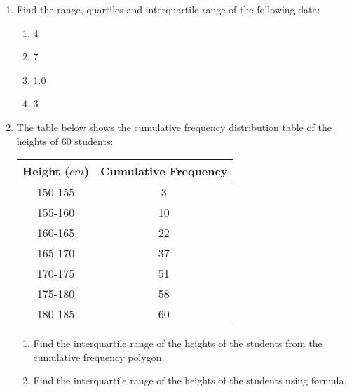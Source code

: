 \documentclass{report}
\begin{document}
\begin{multicols}{2}
  \begin{enumerate}
    \item Find the range, quartiles and interquartile range of the following data:
          \begin{enumerate}
            \item 4          
            \item 7        
            \item 1.0      \   
            \item 3       
          \end{enumerate}
    \item The table below shows the cumulative frequency distribution table of the
          heights of 60 students:
          \begin{center}
            \begin{tabular}{|c|c|}
              \hline
              Height ($cm$) & Cumulative Frequency \\
              \hline
              150-155       & 3                    \\
              155-160       & 10                   \\
              160-165       & 22                   \\
              165-170       & 37                   \\
              170-175       & 51                   \\
              175-180       & 58                   \\
              180-185       & 60                   \\
              \hline
            \end{tabular}
          \end{center}
          \begin{enumerate}
            \item Find the interquartile range of the heights of the students from the cumulative
                  frequency polygon.
            \item Find the interquartile range of the heights of the students using formula.
          \end{enumerate}
  \end{enumerate}


\end{multicols}
\end{document}
